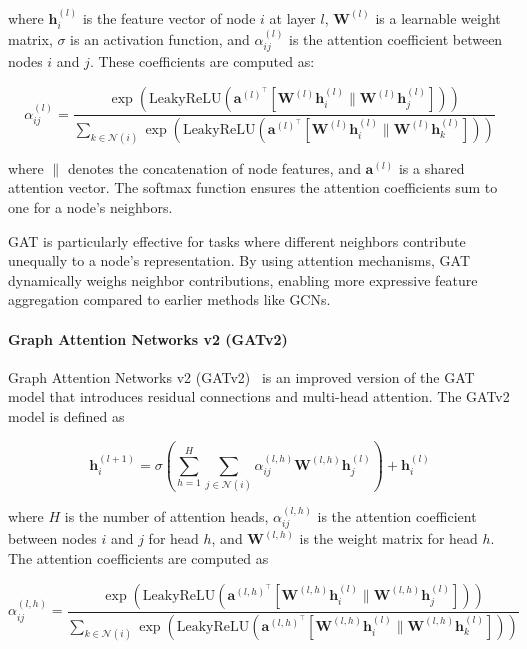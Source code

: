 where $\mathbf{h}_i^{(l)}$ is the feature vector of node $i$ at layer $l$, $\mathbf{W}^{(l)}$ is a learnable weight matrix, $\sigma$ is an activation function, and $\alpha_{ij}^{(l)}$ is the attention coefficient between nodes $i$ and $j$. These coefficients are computed as:

$$
\alpha_{ij}^{(l)} = \frac{\exp \left( \textrm{LeakyReLU} \left( \mathbf{a}^{(l)^\top} [\mathbf{W}^{(l)} \mathbf{h}_i^{(l)} \| \mathbf{W}^{(l)} \mathbf{h}_j^{(l)}] \right) \right)}{\sum_{k \in \mathcal{N}(i)} \exp \left( \textrm{LeakyReLU} \left( \mathbf{a}^{(l)^\top} [\mathbf{W}^{(l)} \mathbf{h}_i^{(l)} \| \mathbf{W}^{(l)} \mathbf{h}_k^{(l)}] \right) \right)}
$$

where $\|$ denotes the concatenation of node features, and $\mathbf{a}^{(l)}$ is a shared attention vector. The softmax function ensures the attention coefficients sum to one for a node's neighbors.

GAT is particularly effective for tasks where different neighbors contribute unequally to a node's representation. By using attention mechanisms, GAT dynamically weighs neighbor contributions, enabling more expressive feature aggregation compared to earlier methods like GCNs.

\paragraph{Graph Attention Networks v2 (GATv2)}
Graph Attention Networks v2 (GATv2)~\cite{brody2021attentive} is an improved version of the GAT model that introduces residual connections and multi-head attention. The GATv2 model is defined as

$$
    \mathbf{h}_i^{(l+1)} = \sigma \left( \sum_{h=1}^{H} \sum_{j \in \mathcal{N}(i)} \alpha_{ij}^{(l,h)} \mathbf{W}^{(l,h)} \mathbf{h}_j^{(l)} \right) + \mathbf{h}_i^{(l)}
$$

where $H$ is the number of attention heads, $\alpha_{ij}^{(l,h)}$ is the attention coefficient between nodes $i$ and $j$ for head $h$, and $\mathbf{W}^{(l,h)}$ is the weight matrix for head $h$. The attention coefficients are computed as

$$
    \alpha_{ij}^{(l,h)} = \frac{\exp \left( \textrm{LeakyReLU} \left( \mathbf{a}^{(l,h)^\top} [\mathbf{W}^{(l,h)} \mathbf{h}_i^{(l)} \| \mathbf{W}^{(l,h)} \mathbf{h}_j^{(l)}] \right) \right)}{\sum_{k \in \mathcal{N}(i)} \exp \left( \textrm{LeakyReLU} \left( \mathbf{a}^{(l,h)^\top} [\mathbf{W}^{(l,h)} \mathbf{h}_i^{(l)} \| \mathbf{W}^{(l,h)} \mathbf{h}_k^{(l)}] \right) \right)}
$$

